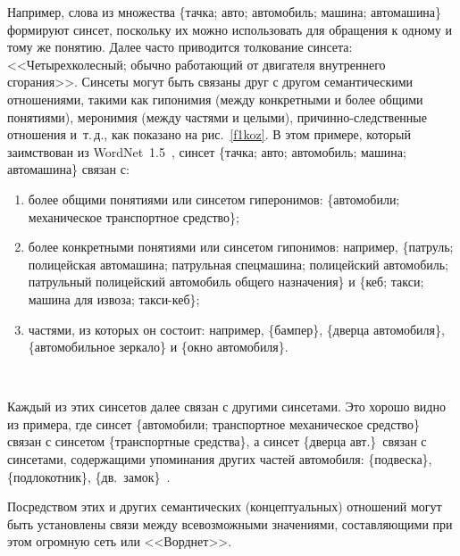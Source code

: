 \begin{multicols}{2}
     Например, слова из множества \{тачка; авто; автомобиль; машина; 
автомашина\} формируют синсет, поскольку их можно использовать для 
обращения к одному и тому же понятию. Далее часто приводится толкование 
синсета: <<Четырехколесный; обычно работающий от двигателя внутреннего 
сгорания>>. Синсеты могут быть связаны друг с другом семантическими 
отношениями, такими как гипонимия (между конкретными и более общими 
понятиями), меронимия (между частями и целыми), причинно-следственные 
отношения и~т.\,д., как показано на рис.~\ref{f1koz}. В этом примере, который 
заимствован из WordNet~1.5~\cite{1koz, 2koz}, синсет \{тачка; авто; 
автомобиль; машина; автомашина\} связан с: 
\begin{enumerate}[(1)]
\item более общими понятиями или синсетом гиперонимов: 
\{автомобили; механическое транспортное средство\};
\item более конкретными понятиями или синсетом гипонимов: 
например, \{патруль; полицейская автомашина; патрульная 
спецмашина; полицейский автомобиль; патрульный полицейский 
автомобиль общего назначения\} и \{кеб; такси; машина для извоза; 
такси-кеб\};
\item частями, из которых он состоит: например, \{бампер\}, \{дверца 
автомобиля\}, \{автомобильное зеркало\} и \{окно автомобиля\}.
\end{enumerate}

\begin{figure*} %
\vspace*{1pt}
\begin{center}
\mbox{%
\epsfxsize=164.817mm
}
\end{center}
\vspace*{-9pt}
\end{figure*}

     Каждый из этих синсетов далее связан с другими синсетами. Это хорошо 
видно из примера, где синсет \{автомобили; транспортное механическое 
средство\} связан с синсетом \{транспортные средства\}, а синсет \{дверца авт.\}\ 
связан с синсетами, содержащими упоминания других частей автомобиля: 
\{подвеска\}, \{подлокотник\}, \{дв.\ замок\}~\cite{1koz}.
     
     Посредством этих и других семантических (концептуальных) отношений 
могут быть установлены связи между всевозможными значениями, 
со\-став\-ля\-ющи\-ми при этом огромную сеть или <<Ворднет>>.
     

\end{multicols}
